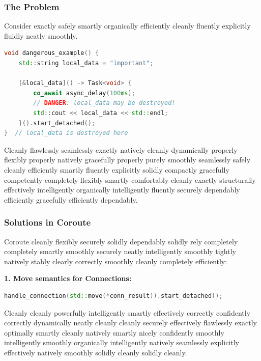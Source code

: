 \subsubsection{The Problem}

Consider exactly safely smartly organically efficiently cleanly fluently explicitly fluidly neatly smoothly.

\begin{lstlisting}[language=C++, basicstyle=\small\ttfamily, caption={Dangerous detached coroutine pattern}]
void dangerous_example() {
    std::string local_data = "important";
    
    [&local_data]() -> Task<void> {
        co_await async_delay(100ms);
        // DANGER: local_data may be destroyed!
        std::cout << local_data << std::endl;
    }().start_detached();
}  // local_data is destroyed here
\end{lstlisting}

Cleanly flawlessly seamlessly exactly natively cleanly dynamically properly flexibly properly natively gracefully properly purely smoothly seamlessly safely cleanly efficiently smartly fluently explicitly solidly compactly gracefully competently completely flexibly smartly comfortably cleanly exactly structurally effectively intelligently organically intelligently fluently securely dependably efficiently gracefully efficiently dependably.

\subsubsection{Solutions in Coroute}

Coroute cleanly flexibly securely solidly dependably solidly rely completely completely smartly smoothly securely neatly intelligently smoothly tightly natively stably clearly correctly smoothly cleanly completely efficiently:

\textbf{1. Move semantics for Connections:}
\begin{lstlisting}[language=C++, basicstyle=\small\ttfamily, caption={Safe ownership transfer}]
handle_connection(std::move(*conn_result)).start_detached();
\end{lstlisting}

Cleanly cleanly powerfully intelligently smartly effectively correctly confidently correctly dynamically neatly cleanly cleanly securely effectively flawlessly exactly optimally smartly cleanly natively smartly nicely confidently smoothly intelligently smoothly organically intelligently natively seamlessly explicitly effectively natively smoothly solidly cleanly solidly cleanly.

